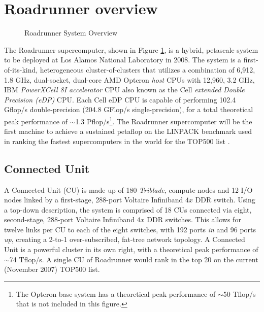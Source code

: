 \documentclass[10pt]{article}
\begin{document}
\section{Roadrunner overview}

\begin{figure}
    \begin{center}
    \caption{Roadrunner System Overview}
    \label{fig:system}
    \end{center}
\end{figure}

The Roadrunner supercomputer, shown in Figure \ref{fig:system}, is a
hybrid, petascale system to be deployed at Los Alamos National
Laboratory in 2008.  The system is a first-of-its-kind, heterogeneous
cluster-of-clusters that utilizes a combination of 6,912, 1.8 GHz,
dual-socket, dual-core AMD Opteron \emph{host} CPUs with 12,960, 3.2
GHz, IBM \emph{PowerXCell 8I accelerator} CPU also known as the Cell
\emph{extended Double Precision (eDP)} CPU.  Each Cell eDP CPU
is capable of performing 102.4 Gflop/s double-precision (204.8 GFlop/s
single-precision), for a total theoretical peak performance of
$\sim$1.3 Pflop/s\footnote{The Opteron base system has a theoretical
peak performance of $\sim$50 Tflop/s that is not included in this
figure.}.  The Roadrunner supercomputer will be the first machine to
achieve a sustained petaflop on the LINPACK benchmark used in ranking
the fastest supercomputers in the world for the TOP500 list
\cite{top500}.

\subsection{Connected Unit}

A Connected Unit (CU) is made up of 180 \emph{Triblade}, compute
nodes and 12 I/O nodes linked by a first-stage, 288-port Voltaire
Infiniband $4x$ DDR switch.  Using a top-down description, the
system is comprised of 18 CUs connected via eight, second-stage,
288-port Voltaire Infiniband $4x$ DDR switches.  This allows for
twelve links per CU to each of the eight switches, with 192 ports
\emph{in} and 96 ports \emph{up}, creating a 2-to-1 over-subscribed,
fat-tree network topology.  A Connected Unit is a powerful cluster in
its own right, with a theoretical peak performance of $\sim$74
Tflop/s.  A single CU of Roadrunner would rank in the top 20 on the
current (November 2007) TOP500 list.
\end{document}
